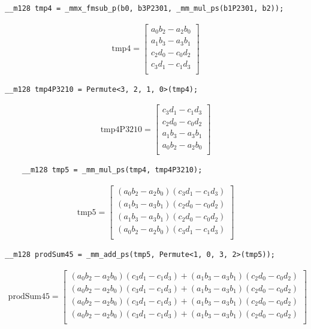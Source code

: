 \documentclass[fontsize = 10pt,DIV = 13]{scrartcl}
\newcommand{\pth}[1]{\left(#1\right)}
\begin{document}
\begin{verbatim}
__m128 tmp4 = _mmx_fmsub_p(b0, b3P2301, _mm_mul_ps(b1P2301, b2));
\end{verbatim}

\begin{align*}
\mathrm{tmp4} 
=
\begin{bmatrix}
a_0b_2 - a_2b_0\\
a_1b_3 - a_3b_1\\
c_2d_0 - c_0d_2\\
c_3d_1 - c_1d_3\\
\end{bmatrix}
\end{align*}

\begin{verbatim}
__m128 tmp4P3210 = Permute<3, 2, 1, 0>(tmp4);
\end{verbatim}

\begin{align*}
\mathrm{tmp4P3210} 
=
\begin{bmatrix}
c_3d_1 - c_1d_3\\
c_2d_0 - c_0d_2\\
a_1b_3 - a_3b_1\\
a_0b_2 - a_2b_0\\
\end{bmatrix}
\end{align*}

\begin{verbatim}
    __m128 tmp5 = _mm_mul_ps(tmp4, tmp4P3210);
\end{verbatim}

\begin{align*}
\mathrm{tmp5} 
=
\begin{bmatrix}
\pth{a_0b_2 - a_2b_0}\pth{c_3d_1 - c_1d_3}\\
\pth{a_1b_3 - a_3b_1}\pth{c_2d_0 - c_0d_2}\\
\pth{a_1b_3 - a_3b_1}\pth{c_2d_0 - c_0d_2}\\
\pth{a_0b_2 - a_2b_0}\pth{c_3d_1 - c_1d_3}\\
\end{bmatrix}
\end{align*}


\begin{verbatim}
__m128 prodSum45 = _mm_add_ps(tmp5, Permute<1, 0, 3, 2>(tmp5));
\end{verbatim}



\begin{align*}
\mathrm{prodSum45} 
=
\begin{bmatrix}
  \pth{a_0b_2 - a_2b_0}\pth{c_3d_1 - c_1d_3}
+ \pth{a_1b_3 - a_3b_1}\pth{c_2d_0 - c_0d_2}\\
  \pth{a_0b_2 - a_2b_0}\pth{c_3d_1 - c_1d_3}
+ \pth{a_1b_3 - a_3b_1}\pth{c_2d_0 - c_0d_2}\\
  \pth{a_0b_2 - a_2b_0}\pth{c_3d_1 - c_1d_3}
+ \pth{a_1b_3 - a_3b_1}\pth{c_2d_0 - c_0d_2}\\
  \pth{a_0b_2 - a_2b_0}\pth{c_3d_1 - c_1d_3}
+ \pth{a_1b_3 - a_3b_1}\pth{c_2d_0 - c_0d_2}\\
\end{bmatrix}
\end{align*}
\end{document}
